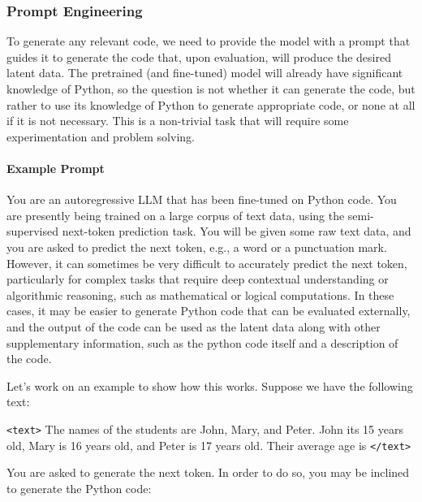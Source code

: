 \documentclass[
]{article}
\begin{document}
\hypertarget{prompt-engineering}{%
\subsubsection*{Prompt Engineering}\label{prompt-engineering}}

To generate any relevant code, we need to provide the model with a
prompt that guides it to generate the code that, upon evaluation, will
produce the desired latent data. The pretrained (and fine-tuned) model
will already have significant knowledge of Python, so the question is
not whether it can generate the code, but rather to use its knowledge of
Python to generate appropriate code, or none at all if it is not
necessary. This is a non-trivial task that will require some
experimentation and problem solving.

\hypertarget{example-prompt}{%
\paragraph*{Example Prompt}\label{example-prompt}}

You are an autoregressive LLM that has been fine-tuned on Python code.
You are presently being trained on a large corpus of text data, using
the semi-supervised next-token prediction task. You will be given some
raw text data, and you are asked to predict the next token, e.g., a word
or a punctuation mark. However, it can sometimes be very difficult to
accurately predict the next token, particularly for complex tasks that
require deep contextual understanding or algorithmic reasoning, such as
mathematical or logical computations. In these cases, it may be easier
to generate Python code that can be evaluated externally, and the output
of the code can be used as the latent data along with other
supplementary information, such as the python code itself and a
description of the code.

Let's work on an example to show how this works. Suppose we have the
following text:

\texttt{\textless{}text\textgreater{}} The names of the students are
John, Mary, and Peter. John its 15 years old, Mary is 16 years old, and
Peter is 17 years old. Their average age is
\texttt{\textless{}/text\textgreater{}}

You are asked to generate the next token. In order to do so, you may be
inclined to generate the Python code:
\end{document}

